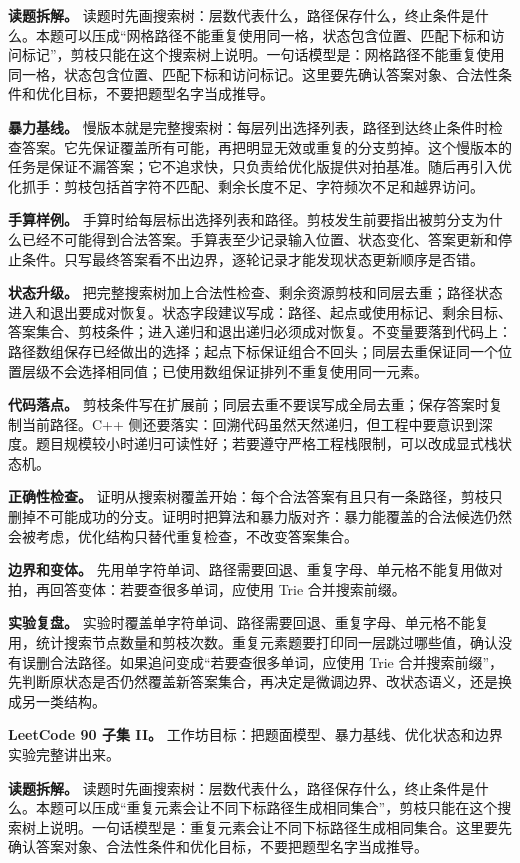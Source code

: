 \textbf{读题拆解。} 读题时先画搜索树：层数代表什么，路径保存什么，终止条件是什么。本题可以压成“网格路径不能重复使用同一格，状态包含位置、匹配下标和访问标记”，剪枝只能在这个搜索树上说明。一句话模型是：网格路径不能重复使用同一格，状态包含位置、匹配下标和访问标记。这里要先确认答案对象、合法性条件和优化目标，不要把题型名字当成推导。

\textbf{暴力基线。} 慢版本就是完整搜索树：每层列出选择列表，路径到达终止条件时检查答案。它先保证覆盖所有可能，再把明显无效或重复的分支剪掉。这个慢版本的任务是保证不漏答案；它不追求快，只负责给优化版提供对拍基准。随后再引入优化抓手：剪枝包括首字符不匹配、剩余长度不足、字符频次不足和越界访问。

\textbf{手算样例。} 手算时给每层标出选择列表和路径。剪枝发生前要指出被剪分支为什么已经不可能得到合法答案。手算表至少记录输入位置、状态变化、答案更新和停止条件。只写最终答案看不出边界，逐轮记录才能发现状态更新顺序是否错。

\textbf{状态升级。} 把完整搜索树加上合法性检查、剩余资源剪枝和同层去重；路径状态进入和退出要成对恢复。状态字段建议写成：路径、起点或使用标记、剩余目标、答案集合、剪枝条件；进入递归和退出递归必须成对恢复。不变量要落到代码上：路径数组保存已经做出的选择；起点下标保证组合不回头；同层去重保证同一个位置层级不会选择相同值；已使用数组保证排列不重复使用同一元素。

\textbf{代码落点。} 剪枝条件写在扩展前；同层去重不要误写成全局去重；保存答案时复制当前路径。C++ 侧还要落实：回溯代码虽然天然递归，但工程中要意识到深度。题目规模较小时递归可读性好；若要遵守严格工程栈限制，可以改成显式栈状态机。

\textbf{正确性检查。} 证明从搜索树覆盖开始：每个合法答案有且只有一条路径，剪枝只删掉不可能成功的分支。证明时把算法和暴力版对齐：暴力能覆盖的合法候选仍然会被考虑，优化结构只替代重复检查，不改变答案集合。

\textbf{边界和变体。} 先用单字符单词、路径需要回退、重复字母、单元格不能复用做对拍，再回答变体：若要查很多单词，应使用 Trie 合并搜索前缀。

\textbf{实验复盘。} 实验时覆盖单字符单词、路径需要回退、重复字母、单元格不能复用，统计搜索节点数量和剪枝次数。重复元素题要打印同一层跳过哪些值，确认没有误删合法路径。如果追问变成“若要查很多单词，应使用 Trie 合并搜索前缀”，先判断原状态是否仍然覆盖新答案集合，再决定是微调边界、改状态语义，还是换成另一类结构。

\noindent\textbf{LeetCode 90 子集 II。} 工作坊目标：把题面模型、暴力基线、优化状态和边界实验完整讲出来。

\textbf{读题拆解。} 读题时先画搜索树：层数代表什么，路径保存什么，终止条件是什么。本题可以压成“重复元素会让不同下标路径生成相同集合”，剪枝只能在这个搜索树上说明。一句话模型是：重复元素会让不同下标路径生成相同集合。这里要先确认答案对象、合法性条件和优化目标，不要把题型名字当成推导。

